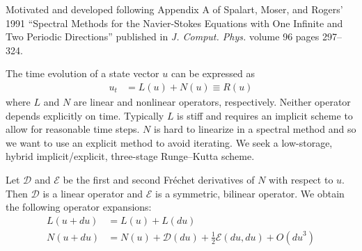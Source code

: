 \documentclass[letterpaper,11pt]{amsart}
\newcommand{\order}[2]{\ensuremath{O\!\left( {#1}^{#2} \right)}}
\begin{document}
Motivated and developed following Appendix A of Spalart, Moser, and
Rogers' 1991 ``Spectral Methods for the Navier-Stokes Equations
with One Infinite and Two Periodic Directions'' published in
\emph{J. Comput. Phys.} volume 96 pages 297--324.

The time evolution of a state vector $u$ can be expressed as
\begin{align}
  u_{t}
  &=
  L(u)
  +
  N(u)
  \equiv
  R(u)
\end{align}
where $L$ and $N$ are linear and nonlinear operators, respectively.
Neither operator depends explicitly on time.  Typically $L$ is stiff
and requires an implicit scheme to allow for reasonable time steps.
$N$ is hard to linearize in a spectral method and so we want to use
an explicit method to avoid iterating.  We seek a low-storage, hybrid
implicit/explicit, three-stage Runge--Kutta scheme.

Let $\mathcal{D}$ and $\mathcal{E}$ be the first and second
Fr\'echet derivatives of $N$ with respect to $u$.  Then
$\mathcal{D}$ is a linear operator and $\mathcal{E}$ is a symmetric,
bilinear operator.  We obtain the following operator expansions:
\begin{subequations}
\begin{align}
  L(u+du)
  &=
  L(u)
  +
  L(du)
\\
  N(u+du)
  &=
  N(u)
  +
  \mathcal{D}(du)
  +
  \frac{1}{2}\mathcal{E}(du,du)
  +
  \order{du}{3}
\end{align}
\end{subequations}
\end{document}
